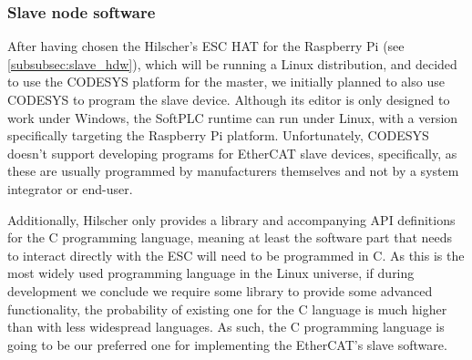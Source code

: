 \subsubsection{Slave node software}

After having chosen the Hilscher's ESC HAT for the Raspberry Pi (see \ref{subsubsec:slave_hdw}), which will be running a Linux distribution, and decided to use the CODESYS platform for the master, we initially planned to also use CODESYS to program the slave device.
Although its editor is only designed to work under Windows, the SoftPLC runtime can run under Linux, with a version specifically targeting the Raspberry Pi platform.
Unfortunately, CODESYS doesn't support developing programs for EtherCAT slave devices, specifically, as these are usually programmed by manufacturers themselves and not by a system integrator or end-user.

Additionally, Hilscher only provides a library and accompanying API definitions for the C programming language, meaning at least the software part that needs to interact directly with the ESC will need to be programmed in C.
As this is the most widely used programming language in the Linux universe, if during development we conclude we require some library to provide some advanced functionality, the probability of existing one for the C language is much higher than with less widespread languages.
As such, the C programming language is going to be our preferred one for implementing the EtherCAT's slave software.


